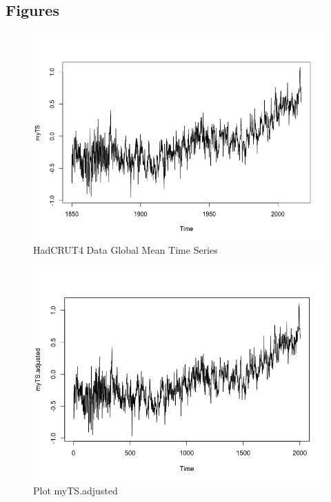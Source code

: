 \documentclass[a4paper,10pt]{article}
\begin{document}
\subsection{Figures}

\begin{figure}[H]
\centering
\caption{HadCRUT4 Data Global Mean Time Series}
\includegraphics[scale=.5]{temp.png}
\end{figure}

\begin{figure}[H]
\centering
\caption{Plot myTS.adjusted}
\includegraphics[scale=.5]{myTSadjusted.png}
\end{figure}
\end{document}
